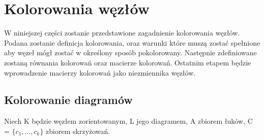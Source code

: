 \section{Kolorowania węzłów}
W niniejszej części zostanie przedstawione zagadnienie kolorowania węzłów. Podana zostanie definicja kolorowania, oraz warunki które muszą zostać spełnione aby węzeł mógł zostać w określony sposób pokolorowany. Następnie zdefiniowane zostaną równania kolorowań oraz macierze kolorowań. Ostatnim etapem będzie wprowadzenie macierzy kolorowań jako niezmiennika węzłów. 

\subsection{Kolorowanie diagramów}

Niech K będzie węzłem zorientowanym, L jego diagramem, A zbiorem łuków,  C = $\lbrace c_{1}, \ldots, c_{k}\rbrace$ zbiorem skrzyżowań. 

